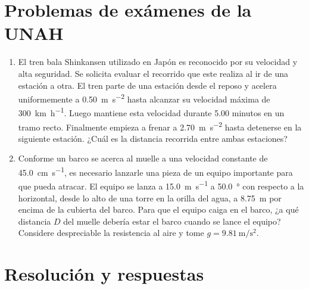 \documentclass{article}
\begin{document}
\maketitle
\newpage

\section{Problemas de exámenes de la UNAH}

\begin{enumerate}
    \item El tren bala Shinkansen utilizado en Japón es reconocido por su velocidad y alta seguridad. Se solicita evaluar el recorrido que este realiza al ir de una estación a otra. El tren parte de una estación desde el reposo y acelera uniformemente a \SI{0.50}{\meter\per\second\squared} hasta alcanzar su velocidad máxima de \SI{300}{\kilo\meter\per\hour}. Luego mantiene esta velocidad durante 5.00 minutos en un tramo recto. Finalmente empieza a frenar a \SI{2.70}{\meter\per\second\squared} hasta detenerse en la siguiente estación. ¿Cuál es la distancia recorrida entre ambas estaciones?\label{unah:1}
    \item Conforme un barco se acerca al muelle a una velocidad constante de \SI{45.0}{\centi\meter\per\second}, es necesario lanzarle una pieza de un equipo importante para que pueda atracar. El equipo se lanza a \SI{15.0}{\meter\per\second} a \SI{50.0}{\degree} con respecto a la horizontal, desde lo alto de una torre en la orilla del agua, a \SI{8.75}{\meter} por encima de la cubierta del barco. Para que el equipo caiga en el barco, ¿a qué distancia $D$ del muelle debería estar el barco cuando se lance el equipo? Considere despreciable la resistencia al aire y tome $g = \SI{9.81}{\meter\per\second\squared}$.\label{unah:2}
\end{enumerate}

\section{Resolución y respuestas}
\end{document}
